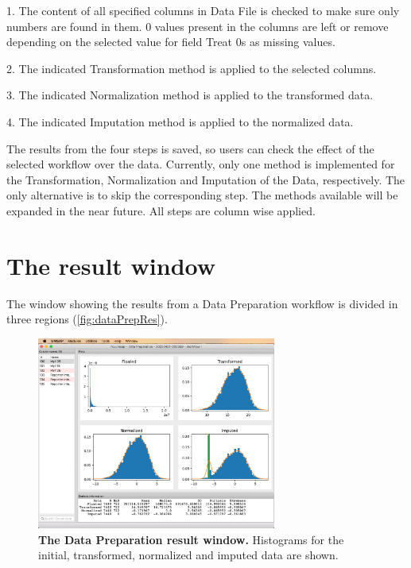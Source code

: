 \num{1}. The content of all specified columns in Data File is checked to make sure
only numbers are found in them. \num{0} values present in the columns are left or
remove depending on the selected value for field Treat \num{0}s as missing values.

\num{2}. The indicated Transformation method is applied to the selected columns.

\num{3}. The indicated Normalization method is applied to the transformed data.

\num{4}. The indicated Imputation method is applied to the normalized data.

The results from the four steps is saved, so users can check the effect of the selected
workflow over the data. Currently, only one method is implemented for the Transformation,
Normalization and Imputation of the Data, respectively. The only alternative is to skip
the corresponding step. The methods available will be expanded in the near future.
All steps are column wise applied.

\section{The result window}

The window showing the results from a Data Preparation workflow is divided in three
regions (\autoref{fig:dataPrepRes}).

\begin{figure}[h]
    \centering
    \includegraphics[width=0.7\textwidth]{./IMAGES/DATAPREP/DataPrepRes.jpg}
    \caption[The Data Preparation result window]{\textbf{The Data Preparation
    result window.} Histograms for the initial, transformed, normalized and
    imputed data are shown. }
    \label{fig:dataPrepRes}
    \vspace{-5pt} 	
\end{figure} 


